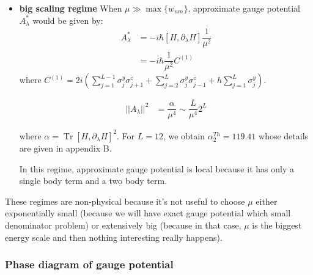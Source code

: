 \documentclass[11pt,a4paper]{article}
\DeclareMathOperator{\Tr}{Tr}
\begin{document}
\begin{itemize}
\item \textbf{big scaling regime} 
When $\mu \gg \max\{w_{nm}\}$, approximate gauge potential $A_{\lambda}^*$ would be given by:
\begin{align*}
A_{\lambda}^* & =  -i \hbar [H,\partial_{\lambda}H ]\dfrac{1}{\mu^2}  \\
& =  -i \hbar \dfrac{1}{\mu^2} C^{(1)}
\end{align*}
where $ C^{(1)}=2i \left(\sum_{j=1}^{L-1} \sigma_j^y \sigma_{j+1}^z + \sum_{j=2}^{L} \sigma_j^y \sigma_{j-1}^z + h \sum_{j=1}^{L}\sigma_j^y \right) $.


\begin{align*}
||A_{\lambda}||^2 &=\dfrac{\alpha}{ \mu^4} \sim\dfrac{L}{ \mu^4} 2^L 
\end{align*}

where $\alpha=\Tr  [H, \partial_{\lambda}H]^2 $.  For $L=12$, we obtain $\alpha_2^{Th}=119.41$ whose details are given in appendix B.


In this regime, approximate gauge potential is local because it has only a single body term and a two body term. 
\end{itemize}

These regimes are non-physical because it's not useful to choose $\mu$ either exponentially small (because we will have exact gauge potential which small denominator problem) or extensively big (because in that case, $\mu$ is the biggest energy scale and then nothing interesting really happens). 

\subsubsection*{Phase diagram of gauge potential }
\end{document}
